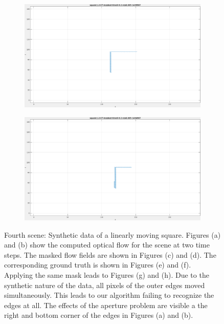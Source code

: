 \begin{figure}[tb]
\begin{subfigure}{.45\textwidth}
  \caption{}
\end{subfigure}
\begin{subfigure}{.45\textwidth}
  \centering
  \includegraphics[height=.6\linewidth]{figs/square12/square12-GT-masked-1.png}
  \caption{}
\end{subfigure}
\begin{subfigure}{.45\textwidth}
  \centering
  \includegraphics[height=.6\linewidth]{figs/square12/square12-GT-masked-2.png}
  \caption{}
\end{subfigure}
\caption[Fourth scene: Synthetic data of a linearly moving square.]{Fourth scene: Synthetic data of a linearly moving square.
Figures (a) and (b) show the computed optical flow for the scene at two time steps. The masked flow fields are shown in Figures (c) and (d).
The corresponding ground truth is shown in Figures (e) and (f). Applying the same mask leads to Figures (g) and (h).
Due to the synthetic nature of the data, all pixels of the outer edges moved simultaneously.
This leads to our algorithm failing to recognize the edges at all.
The effects of the aperture problem are visible a the right and bottom corner of the edges in Figures (a) and (b).
}
\label{fig:square12-snapshots}
\end{figure}

